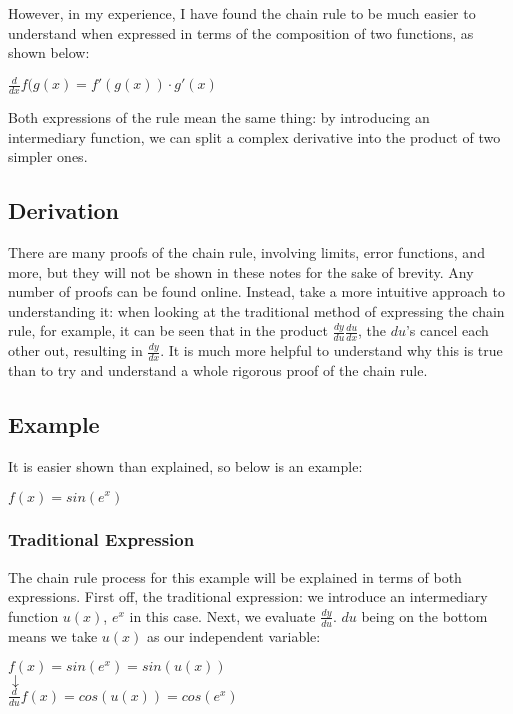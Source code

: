 \documentclass[11pt]{article}
\begin{document}
However, in my experience, I have found the chain rule to be much easier to understand when expressed in terms of the composition of two functions, as shown below:

\begin{center}
$\frac{d}{dx}f(g(x) = f'(g(x)) \cdot g'(x)$
\end{center}

Both expressions of the rule mean the same thing: by introducing an intermediary function, we can split a complex derivative into the product of two simpler ones. 

\subsection{Derivation}
There are many proofs of the chain rule, involving limits, error functions, and more, but they will not be shown in these notes for the sake of brevity. Any number of proofs can be found online. Instead, take a more intuitive approach to understanding it: when looking at the traditional method of expressing the chain rule, for example, it can be seen that in the product $\frac{dy}{du} \frac{du}{dx}$, the $du$'s cancel each other out, resulting in $\frac{dy}{dx}$. It is much more helpful to understand why this is true than to try and understand a whole rigorous proof of the chain rule.

\subsection{Example}
It is easier shown than explained, so below is an example:

\begin{center}
$ f(x) = sin(e^x) $
\end{center}

\subsubsection{Traditional Expression}
The chain rule process for this example will be explained in terms of both expressions. First off, the traditional expression: we introduce an intermediary function $u(x)$, $e^x$ in this case. Next, we evaluate $\frac{dy}{du}$. $du$ being on the bottom means we take $u(x)$ as our independent variable: 

\begin{center}
$ f(x) = sin(e^x) = sin(u(x)) $\\
$\downarrow$\\
$\frac{d}{du} f(x) = cos(u(x)) = cos(e^x)$
\end{center}
\end{document}
